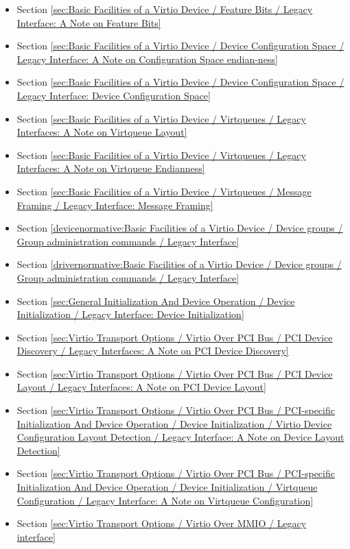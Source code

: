\begin{itemize}
\item Section \ref{sec:Basic Facilities of a Virtio Device /
Feature Bits / Legacy Interface: A Note on Feature Bits}
\item Section \ref{sec:Basic Facilities of a Virtio Device / Device Configuration Space / Legacy Interface: A Note on Configuration Space endian-ness}
\item Section \ref{sec:Basic Facilities of a Virtio Device / Device Configuration Space / Legacy Interface: Device Configuration Space}
\item Section \ref{sec:Basic Facilities of a Virtio Device / Virtqueues / Legacy Interfaces: A Note on Virtqueue Layout}
\item Section \ref{sec:Basic Facilities of a Virtio Device / Virtqueues / Legacy Interfaces: A Note on Virtqueue Endianness}
\item Section \ref{sec:Basic Facilities of a Virtio Device / Virtqueues / Message Framing / Legacy Interface: Message Framing}
\item Section \ref{devicenormative:Basic Facilities of a Virtio Device / Device groups / Group administration commands / Legacy Interface}
\item Section \ref{drivernormative:Basic Facilities of a Virtio Device / Device groups / Group administration commands / Legacy Interface}
\item Section \ref{sec:General Initialization And Device Operation / Device Initialization / Legacy Interface: Device Initialization}
\item Section \ref{sec:Virtio Transport Options / Virtio Over PCI Bus / PCI Device Discovery / Legacy Interfaces: A Note on PCI Device Discovery}
\item Section \ref{sec:Virtio Transport Options / Virtio Over PCI Bus / PCI Device Layout / Legacy Interfaces: A Note on PCI Device Layout}
\item Section \ref{sec:Virtio Transport Options / Virtio Over PCI Bus / PCI-specific Initialization And Device Operation / Device Initialization / Virtio Device Configuration Layout Detection / Legacy Interface: A Note on Device Layout Detection}
\item Section \ref{sec:Virtio Transport Options / Virtio Over PCI Bus / PCI-specific Initialization And Device Operation / Device Initialization / Virtqueue Configuration / Legacy Interface: A Note on Virtqueue Configuration}
\item Section \ref{sec:Virtio Transport Options / Virtio Over MMIO / Legacy interface}

\end{itemize}
